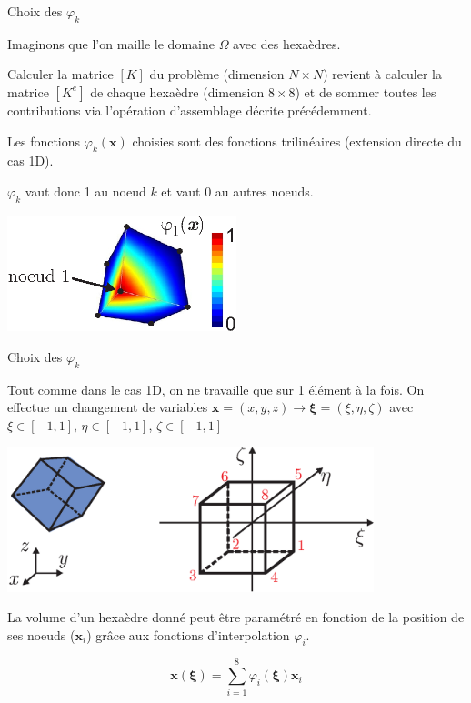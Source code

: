 \documentclass[
mode=present,    %
paper=a4paper,   %
orient=landscape,
display=slides,   %
size=10pt,     %
style=romain   %
]{powerdot}
\begin{document}
\begin{slide}{Choix des $\varphi_k$}


Imaginons que l'on maille le domaine $\Omega$ avec des hexaèdres.

\bigskip

Calculer la matrice $[K]$ du problème (dimension $N\times N$) revient à calculer la matrice $[K^e]$ de chaque hexaèdre (dimension $8\times 8$) et de sommer toutes les contributions via l'opération d'assemblage décrite précédemment.

\bigskip

Les fonctions $\varphi_k(\boldsymbol{x})$ choisies sont des fonctions trilinéaires (extension directe du cas 1D).

$\varphi_k$ vaut donc 1 au noeud $k$ et vaut 0 au autres noeuds.

\bigskip

    \centerline{\includegraphics[width=0.5\textwidth]{phi3d.eps} }

\end{slide}


\begin{slide}[toc=]{Choix des $\varphi_k$}

Tout comme dans le cas 1D, on ne travaille que sur 1 élément à la fois. On effectue un changement de variables $\boldsymbol{x}=(x,y,z) \rightarrow \boldsymbol{\xi}=(\xi,\eta,\zeta)$ avec $\xi\in[-1,1]$, $\eta\in[-1,1]$, $\zeta\in[-1,1]$

    \centerline{\includegraphics[width=0.8\textwidth]{hexa.eps} }

La volume d'un hexaèdre donné peut être paramétré en fonction de la position de ses noeuds ($\boldsymbol{x}_i$) grâce aux fonctions d'interpolation $\varphi_i$.

\begin{equation*}
    \boldsymbol{x}(\boldsymbol{\xi}) = \sum_{i=1}^8 \varphi_i(\boldsymbol{\xi}) \boldsymbol{x}_i
\end{equation*}

\end{slide}
\end{document}
